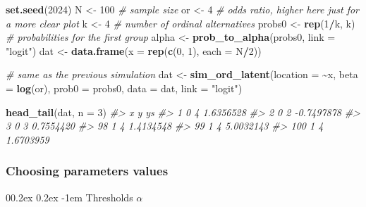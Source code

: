 \documentclass[
  man,floatsintext]{apa6}
\makeatletter
\newenvironment{Shaded}{\begin{snugshade}}{\end{snugshade}}
\newcommand{\AttributeTok}[1]{\textcolor[rgb]{0.13,0.29,0.53}{#1}}
\newcommand{\CommentTok}[1]{\textcolor[rgb]{0.56,0.35,0.01}{\textit{#1}}}
\newcommand{\DecValTok}[1]{\textcolor[rgb]{0.00,0.00,0.81}{#1}}
\newcommand{\FunctionTok}[1]{\textcolor[rgb]{0.13,0.29,0.53}{\textbf{#1}}}
\newcommand{\NormalTok}[1]{#1}
\newcommand{\OtherTok}[1]{\textcolor[rgb]{0.56,0.35,0.01}{#1}}
\newcommand{\SpecialCharTok}[1]{\textcolor[rgb]{0.81,0.36,0.00}{\textbf{#1}}}
\newcommand{\StringTok}[1]{\textcolor[rgb]{0.31,0.60,0.02}{#1}}
\let\oldparagraph\paragraph
\renewcommand{\paragraph}[1]{\oldparagraph{#1}\mbox{}}
\renewcommand{\paragraph}{\@startsection{paragraph}{4}{\parindent}%
  {0\baselineskip \@plus 0.2ex \@minus 0.2ex}%
  {-1em}%
  {\normalfont\normalsize\bfseries\itshape\typesectitle}}
\makeatother
\begin{document}
\scriptsize

\begin{Shaded}
\begin{Highlighting}[]
\FunctionTok{set.seed}\NormalTok{(}\DecValTok{2024}\NormalTok{)}
\NormalTok{N }\OtherTok{\textless{}{-}} \DecValTok{100} \CommentTok{\# sample size}
\NormalTok{or }\OtherTok{\textless{}{-}} \DecValTok{4} \CommentTok{\# odds ratio, higher here just for a more clear plot}
\NormalTok{k }\OtherTok{\textless{}{-}} \DecValTok{4} \CommentTok{\# number of ordinal alternatives}
\NormalTok{probs0 }\OtherTok{\textless{}{-}} \FunctionTok{rep}\NormalTok{(}\DecValTok{1}\SpecialCharTok{/}\NormalTok{k, k) }\CommentTok{\# probabilities for the first group}
\NormalTok{alpha }\OtherTok{\textless{}{-}} \FunctionTok{prob\_to\_alpha}\NormalTok{(probs0, }\AttributeTok{link =} \StringTok{"logit"}\NormalTok{)}
\NormalTok{dat }\OtherTok{\textless{}{-}} \FunctionTok{data.frame}\NormalTok{(}\AttributeTok{x =} \FunctionTok{rep}\NormalTok{(}\FunctionTok{c}\NormalTok{(}\DecValTok{0}\NormalTok{, }\DecValTok{1}\NormalTok{), }\AttributeTok{each =}\NormalTok{ N}\SpecialCharTok{/}\DecValTok{2}\NormalTok{))}

\CommentTok{\# same as the previous simulation}
\NormalTok{dat }\OtherTok{\textless{}{-}} \FunctionTok{sim\_ord\_latent}\NormalTok{(}\AttributeTok{location =} \SpecialCharTok{\textasciitilde{}}\NormalTok{x, }\AttributeTok{beta =} \FunctionTok{log}\NormalTok{(or), }\AttributeTok{prob0 =}\NormalTok{ probs0, }\AttributeTok{data =}\NormalTok{ dat, }\AttributeTok{link =} \StringTok{"logit"}\NormalTok{)}

\FunctionTok{head\_tail}\NormalTok{(dat, }\AttributeTok{n =} \DecValTok{3}\NormalTok{)}
\CommentTok{\#\textgreater{}     x y         ys}
\CommentTok{\#\textgreater{} 1   0 4  1.6356528}
\CommentTok{\#\textgreater{} 2   0 2 {-}0.7497878}
\CommentTok{\#\textgreater{} 3   0 3  0.7554420}
\CommentTok{\#\textgreater{} 98  1 4  1.4134548}
\CommentTok{\#\textgreater{} 99  1 4  5.0032143}
\CommentTok{\#\textgreater{} 100 1 4  1.6703959}
\end{Highlighting}
\end{Shaded}

\normalsize

\subsubsection{Choosing parameters values}\label{choosing-parameters-values}

\paragraph{\texorpdfstring{Thresholds \(\alpha\)}{Thresholds \textbackslash alpha}}\label{thresholds-alpha}
\end{document}
